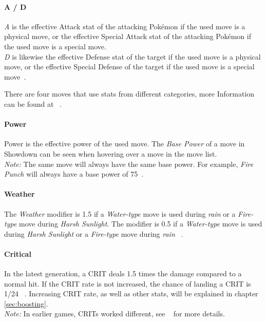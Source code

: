 \paragraph{A / D}
\textit{A} is the effective Attack stat of the attacking Pokémon if the used move is a physical move,
or the effective Special Attack stat of the attacking Pokémon if the used move is a special move.
\\
\textit{D} is likewise the effective Defense stat of the target if the used move is a physical move,
or the effective Special Defense of the target if the used move is a special move~\autocite{Bulbapedia:Damage}.

There are four moves that use stats from different categories, more Information can be found
at ~\autocite{Bulbapedia:Category:Moves-that-use-stats-from-different-categories}.

\paragraph{Power}
Power is the effective power of the used move.
The \textit{Base Power} of a move in Showdown can be seen when hovering over a move in the move list. \\
\textit{Note:} The same move will always have the same base power. For example, \textit{Fire Punch} will
always have a base power of 75~\autocite{Bulbapedia:FirePunch}.

\paragraph{Weather}
The \textit{Weather} modifier is 1.5 if a \textit{Water-type} move is used during \textit{rain} or a 
\textit{Fire-type} move during \textit{Harsh Sunlight}. The modifier is 0.5 if a \textit{Water-type} move
is used during \textit{Harsh Sunlight} or a \textit{Fire-type} move during \textit{rain} ~\autocite{Bulbapedia:Damage}.

\paragraph{Critical}
In the latest generation, a \ac{CRIT} deals 1.5 times the damage compared to a normal hit.
If the \ac{CRIT} rate is not increased, the chance of landing a \ac{CRIT} is 1/24
~\autocite{Bulbapedia:CriticalHit}. Increasing \ac{CRIT} rate, as well as other stats, will 
be explained in chapter \ref{sec:boosting}. \\
\textit{Note:} In earlier games, \ac{CRIT}s worked different, see ~\autocite{Bulbapedia:CriticalHit} for
more details.

